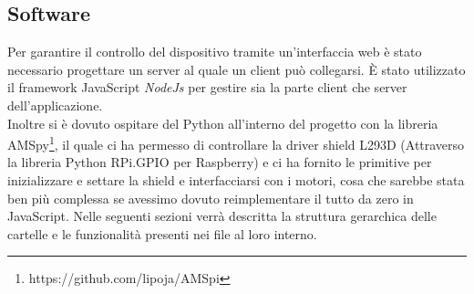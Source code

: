 \documentclass[11pt]{article}
\begin{document}
\subsection{Software}
Per garantire il controllo del dispositivo tramite un'interfaccia web è stato necessario progettare un server al quale un client può collegarsi. È stato utilizzato il framework JavaScript \textit{NodeJs} per gestire sia la parte client che server dell'applicazione.\\
Inoltre si è dovuto ospitare del Python all'interno del progetto con la libreria AMSpy\footnote{https://github.com/lipoja/AMSpi}, il quale ci ha permesso di controllare la driver shield L293D (Attraverso la libreria Python RPi.GPIO per Raspberry) e ci ha fornito le primitive per inizializzare e settare la shield e interfacciarsi con i motori, cosa che sarebbe stata ben più complessa se avessimo dovuto reimplementare il tutto da zero in JavaScript.
 Nelle seguenti sezioni verrà descritta la struttura gerarchica delle cartelle e le funzionalità presenti nei file al loro interno.
\end{document}
